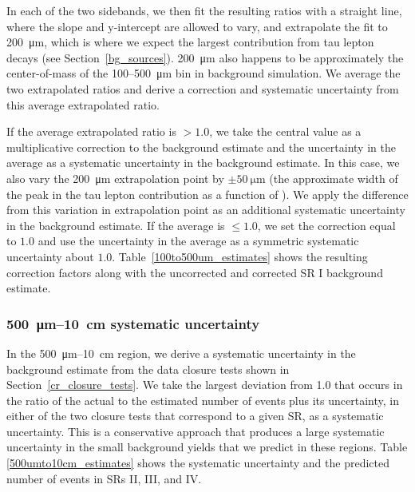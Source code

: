In each of the two sidebands, we then fit the resulting ratios with a straight line, where the slope and y-intercept are allowed to vary, and extrapolate the fit to \SI{200}{\um}, which is where we expect the largest contribution from tau lepton decays (see Section~\ref{bg_sources}). \SI{200}{\um} also happens to be approximately the center-of-mass of the \num{100}--\SI{500}{\um} bin in background simulation. We average the two extrapolated ratios and derive a correction and systematic uncertainty from this average extrapolated ratio.



If the average extrapolated ratio is $>1.0$, we take the central value as a multiplicative correction to the background estimate and the uncertainty in the average as a systematic uncertainty in the background estimate. In this case, we also vary the \SI{200}{\um} extrapolation point by $\pm\SI{50}{\um}$ (the approximate width of the peak in the tau lepton contribution as a function of \ad). We apply the difference from this variation in extrapolation point as an additional systematic uncertainty in the background estimate. If the average is $\leq 1.0$, we set the correction equal to $1.0$ and use the uncertainty in the average as a symmetric systematic uncertainty about $1.0$. Table~\ref{100to500um_estimates} shows the resulting correction factors along with the uncorrected and corrected SR I background estimate.



\subsubsection{\SI{500}{\um}--\SI{10}{\cm} systematic uncertainty}
In the \SI{500}{\um}--\SI{10}{\cm} region, we derive a systematic uncertainty in the background estimate from the data closure tests shown in Section~\ref{cr_closure_tests}. We take the largest deviation from \num{1.0} that occurs in the ratio of the actual to the estimated number of events plus its uncertainty, in either of the two closure tests that correspond to a given SR, as a systematic uncertainty. This is a conservative approach that produces a large systematic uncertainty in the small background yields that we predict in these regions. Table \ref{500umto10cm_estimates} shows the systematic uncertainty and the predicted number of events in SRs II, III, and IV.



